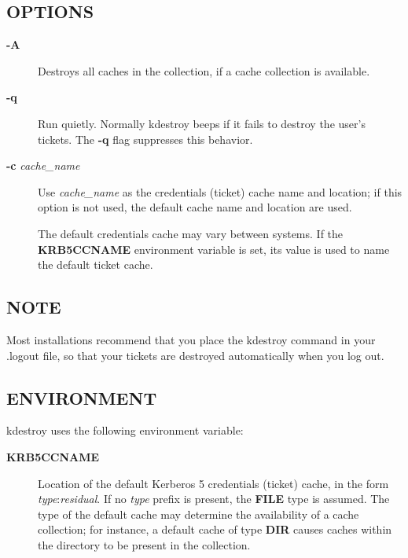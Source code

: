 \documentclass[letterpaper,10pt,english]{sphinxmanual}
\begin{document}
\subsection{OPTIONS}
\label{user/user_commands/kdestroy:options}\begin{description}
\item[{\textbf{-A}}] \leavevmode
Destroys all caches in the collection, if a cache collection is
available.

\item[{\textbf{-q}}] \leavevmode
Run quietly.  Normally kdestroy beeps if it fails to destroy the
user's tickets.  The \textbf{-q} flag suppresses this behavior.

\item[{\textbf{-c} \emph{cache\_name}}] \leavevmode
Use \emph{cache\_name} as the credentials (ticket) cache name and
location; if this option is not used, the default cache name and
location are used.

The default credentials cache may vary between systems.  If the
\textbf{KRB5CCNAME} environment variable is set, its value is used to
name the default ticket cache.

\end{description}


\subsection{NOTE}
\label{user/user_commands/kdestroy:note}
Most installations recommend that you place the kdestroy command in
your .logout file, so that your tickets are destroyed automatically
when you log out.


\subsection{ENVIRONMENT}
\label{user/user_commands/kdestroy:environment}
kdestroy uses the following environment variable:
\begin{description}
\item[{\textbf{KRB5CCNAME}}] \leavevmode
Location of the default Kerberos 5 credentials (ticket) cache, in
the form \emph{type}:\emph{residual}.  If no \emph{type} prefix is present, the
\textbf{FILE} type is assumed.  The type of the default cache may
determine the availability of a cache collection; for instance, a
default cache of type \textbf{DIR} causes caches within the directory
to be present in the collection.

\end{description}
\end{document}
